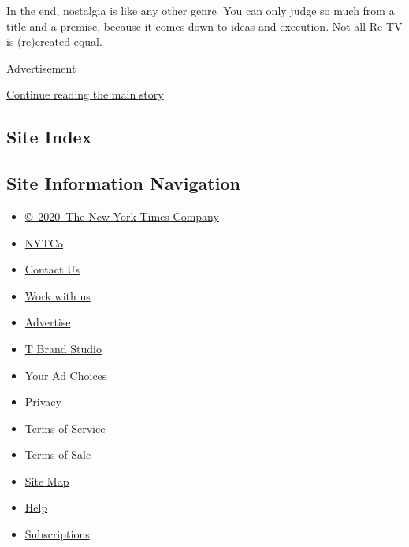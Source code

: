 In the end, nostalgia is like any other genre. You can only judge so
much from a title and a premise, because it comes down to ideas and
execution. Not all Re TV is (re)created equal.

Advertisement

\protect\hyperlink{after-bottom}{Continue reading the main story}

\hypertarget{site-index}{%
\subsection{Site Index}\label{site-index}}

\hypertarget{site-information-navigation}{%
\subsection{Site Information
Navigation}\label{site-information-navigation}}

\begin{itemize}
\tightlist
\item
  \href{https://help.nytimes.com/hc/en-us/articles/115014792127-Copyright-notice}{©~2020~The
  New York Times Company}
\end{itemize}

\begin{itemize}
\tightlist
\item
  \href{https://www.nytco.com/}{NYTCo}
\item
  \href{https://help.nytimes.com/hc/en-us/articles/115015385887-Contact-Us}{Contact
  Us}
\item
  \href{https://www.nytco.com/careers/}{Work with us}
\item
  \href{https://nytmediakit.com/}{Advertise}
\item
  \href{http://www.tbrandstudio.com/}{T Brand Studio}
\item
  \href{https://www.nytimes.com/privacy/cookie-policy\#how-do-i-manage-trackers}{Your
  Ad Choices}
\item
  \href{https://www.nytimes.com/privacy}{Privacy}
\item
  \href{https://help.nytimes.com/hc/en-us/articles/115014893428-Terms-of-service}{Terms
  of Service}
\item
  \href{https://help.nytimes.com/hc/en-us/articles/115014893968-Terms-of-sale}{Terms
  of Sale}
\item
  \href{https://spiderbites.nytimes.com}{Site Map}
\item
  \href{https://help.nytimes.com/hc/en-us}{Help}
\item
  \href{https://www.nytimes.com/subscription?campaignId=37WXW}{Subscriptions}
\end{itemize}
